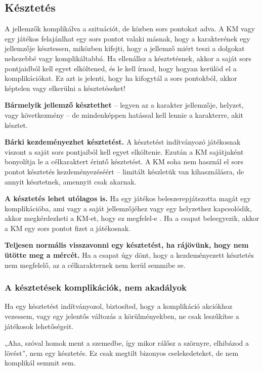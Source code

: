 \subsection{Késztetés}

A jellemzők  komplikálva a szituációt, de közben sors pontokat adva. A KM vagy egy játékos felajánlhat egy sors pontot valaki másnak, hogy a karakterének egy jellemzője késztessen, miközben kifejti, hogy a jellemző miért teszi a dolgokat nehezebbé vagy komplikáltabbá. Ha ellenállsz a késztetésnek, akkor a saját sors pontjaidból kell egyet elköltened, és le kell írnod, hogy hogyan kerülöd el a komplikációkat. Ez azt is jelenti, hogy ha kifogytál a sors pontokból, akkor képtelen vagy elkerülni a késztetéseket!

\textbf{Bármelyik jellemző késztethet} – legyen az a karakter jellemzője, helyzet, vagy következmény – de mindenképpen hatással kell lennie a karakterre, akit késztet.

\textbf{Bárki kezdeményezhet késztetést.} A késztetést indítványozó játékosnak viszont a saját sors pontjaiból kell egyet elköltenie. Ezután a KM sajátjaként bonyolítja le a célkaraktert érintő késztetést. A KM soha nem használ el sors pontot késztetés kezdeményezéséért – limitált készletük van kihasználásra, de annyit késztetnek, amennyit csak akarnak.

\textbf{A késztetés lehet utólagos is.} Ha egy játékos beleszerepjátszotta magát egy komplikációba, ami vagy a saját jellemzőjéhez vagy egy helyzethez kapcsolódik, akkor megkérdezheti a KM‑et, hogy ez megfelel‑e . Ha a csapat beleegyezik, akkor a KM egy sors pontot fizet a játékosnak.

\textbf{Teljesen normális visszavonni egy késztetést, ha rájövünk, hogy nem ütötte meg a mércét.} Ha a csapat úgy dönt, hogy a kezdeményezett késztetés nem megfelelő, az a célkarakternek nem kerül semmibe se.

\subsubsection{A késztetések komplikációk, nem akadályok}

Ha egy késztetést indítványozol, biztosítsd, hogy a komplikáció akciókhoz vezessem, vagy egy jelentős változás a körülményekben, ne csak leszűkítse a játékosok lehetőségeit.

„Aha, szóval homok ment a szemedbe, így mikor rálősz a szörnyre, elhibázod a lövést”, nem egy késztetés. Ez csak megtilt bizonyos cselekedeteket, de nem komplikál semmit sem.

